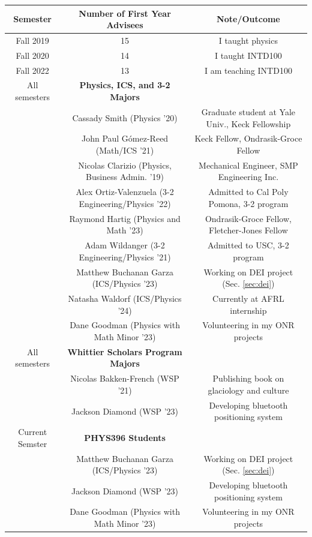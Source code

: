 \documentclass[../../main.tex]{subfiles}
\begin{document}
\begin{table}[hb]
\small
\centering
\begin{tabular}{| c | c | c |}
\hline
\hline
Semester & \textbf{Number of First Year Advisees} & Note/Outcome \\ \hline
Fall 2019 & 15 & I taught physics \\ \hline
Fall 2020 & 14 & I taught INTD100 \\ \hline
Fall 2022 & 13 & I am teaching INTD100 \\ \hline
\hline
All semesters & \textbf{Physics, ICS, and 3-2 Majors} & \\ \hline 
& Cassady Smith (Physics '20) & Graduate student at Yale Univ., Keck Fellowship \\ \hline
& John Paul G\'{o}mez-Reed (Math/ICS '21) & Keck Fellow, Ondrasik-Groce Fellow \\ \hline
& Nicolas Clarizio (Physics, Business Admin. '19) & Mechanical Engineer, SMP Engineering Inc. \\ \hline
& Alex Ortiz-Valenzuela (3-2 Engineering/Physics  '22) & Admitted to Cal Poly Pomona, 3-2 program \\ \hline
& Raymond Hartig (Physics and Math '23) & Ondrasik-Groce Fellow, Fletcher-Jones Fellow \\ \hline
& Adam Wildanger (3-2 Engineering/Physics '21) & Admitted to USC, 3-2 program \\ \hline
& Matthew Buchanan Garza (ICS/Physics '23) & Working on DEI project (Sec. \ref{sec:dei}) \\ \hline
& Natasha Waldorf (ICS/Physics '24) & Currently at AFRL internship \\ \hline
& Dane Goodman (Physics with Math Minor '23) & Volunteering in my ONR projects \\ \hline \hline
All semesters & \textbf{Whittier Scholars Program Majors} & \\ \hline
& Nicolas Bakken-French (WSP '21) & Publishing book on glaciology and culture \\ \hline
& Jackson Diamond (WSP '23) & Developing bluetooth positioning system \\ \hline \hline
Current Semster & \textbf{PHYS396 Students}  & \\ \hline
& Matthew Buchanan Garza (ICS/Physics '23) & Working on DEI project (Sec. \ref{sec:dei}) \\ \hline
& Jackson Diamond (WSP '23) & Developing bluetooth positioning system \\ \hline
& Dane Goodman (Physics with Math Minor '23) & Volunteering in my ONR projects \\ \hline

\end{tabular}
\end{table}
\end{document}
